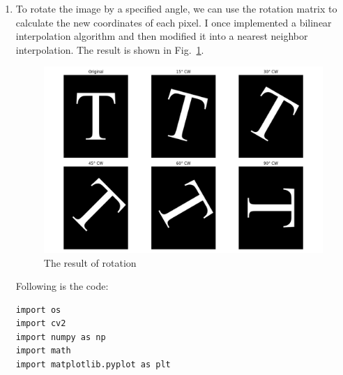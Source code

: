 \documentclass[12pt,a4paper]{article}
\begin{document}
\begin{enumerate}
\begin{verbatim}
os.makedirs("result/p2", exist_ok=True)

def reduce_gray_levels(img, nLevels=2):
    if nLevels < 2 or nLevels > 256 or (nLevels & (nLevels - 1)):
        raise ValueError("invalid input: nLevels must be a power of 2 and between 2 and 256.")

    delta = 256 // nLevels
    quantized = (img // delta) * delta + delta // 2
    return quantized.astype(np.uint8)

img = cv2.imread("src/Fig1.bmp", cv2.IMREAD_GRAYSCALE)
if img is None:
    raise FileNotFoundError("Cannot open Fig1.bmp")

nLevels = int(input("Enter the number of gray levels (should be a power of 2 and between 2 and 256, e.g., 2,4,8,...,256): "))

out = reduce_gray_levels(img, nLevels)

cv2.imwrite(f"result/p2/gray_{nLevels}.bmp", out)
print(f"Result image saved to result/p2/gray_{nLevels}.bmp")

cv2.imshow(f"{nLevels} levels", out)
cv2.waitKey(0)
cv2.destroyAllWindows()
    \end{verbatim}
    \item To rotate the image by a specified angle, we can use the rotation matrix to calculate the new coordinates of each pixel. I once implemented a bilinear interpolation algorithm and then modified it into a nearest neighbor interpolation. The result is shown in Fig.~\ref{fig:p3}.

    \begin{figure}[H]
        \centering
        \includegraphics[width=1\textwidth]{src/img/p3/combined_grid.png}
        \caption{The result of rotation}
        \label{fig:p3}
    \end{figure}
    Following is the code:
    \begin{verbatim}
import os
import cv2
import numpy as np
import math
import matplotlib.pyplot as plt


\end{verbatim}
\end{enumerate}
\end{document}
